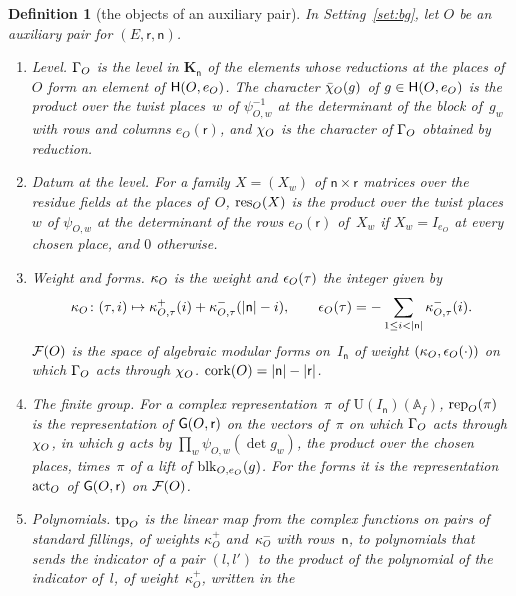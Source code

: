 \documentclass[11pt,a4paper]{article}
\newcommand{\m}[1]{\mbox{$#1$}}        %
\theoremstyle{plainx}
\theoremstyle{uprightx}
\newtheorem{definition}[theorem]{Definition}
\newcommand{\AAA}{\mathbb{A}}
\newcommand{\ix}[1]{\mathsf{#1}}
\newcommand{\UU}{\mathrm{U}}
\newcommand{\KK}[1]{\mathbf{K}_{#1}}
\begin{document}
\begin{definition}[the objects of an auxiliary pair]\label{d:auxobj}
In Setting~\ref{set:bg}, let $O$ be an auxiliary pair for \m{(E,\ix r,\ix n)}.
\begin{enumerate}[label=\textup{(\arabic*)},leftmargin=2.3em,itemsep=2pt]
\item \emph{Level.} \m{\levelGroup{O}} is the level in \m{\KK{\ix n}} of the elements whose reductions at the places
of~$O$ form an element of \m{\auxLevel{O}{e_O}}. The character \m{\auxLevelChar{O}{g}} of \m{g\in\auxLevel{O}{e_O}} is the
product over the twist places~$w$ of \m{\psi_{O,w}^{-1}} at the determinant of the block of~$g_w$ with rows and
columns \m{e_O(\ix r)}, and \m{\levelChar{O}} is the character of \m{\levelGroup{O}} obtained by reduction.
\item \emph{Datum at the level.} For a family \m{X=(X_w)} of \m{\ix n\times\ix r} matrices over the residue fields at
the places of~$O$, \m{\resDetDatum{O}{X}} is the product over the twist places~$w$ of \m{\psi_{O,w}} at the determinant
of the rows \m{e_O(\ix r)} of~$X_w$ if \m{X_w=I_{e_O}} at every chosen place, and $0$ otherwise.
\item \emph{Weight and forms.} \m{\auxKappa{O}} is the weight and \m{\detExp{O}{\tau}} the integer given by
\[\auxKappa{O}\colon(\tau,i)\mapsto\kappa^{+}_{O,\tau}(i)+\kappa^{-}_{O,\tau}(|\ix n|-i),\qquad
\detExp{O}{\tau}=-\sum_{1\le i<|\ix n|}\kappa^{-}_{O,\tau}(i).\] \m{\FormV{O}} is the space of algebraic modular
forms on~$I_{\ix n}$ of weight \m{(\auxKappa{O},\detExp{O}{\cdot})} on which \m{\levelGroup{O}} acts through
\m{\levelChar{O}}. \m{\rankDiff{O}=|\ix n|-|\ix r|}.
\item \emph{The finite group.} For a complex representation~$\pi$ of \m{\UU(I_{\ix n})(\AAA_f)},
\m{\chosenGLRep{O}{\pi}} is the representation of \m{\ChosenGL{O}{\ix r}} on the vectors of~$\pi$ on which
\m{\levelGroup{O}} acts through \m{\levelChar{O}}, in which $g$ acts by \m{\prod_w\psi_{O,w}(\det g_w)}, the product
over the chosen places, times~$\pi$ of a lift of \m{\firstBlockHom{O}{e_O}{g}}. For the forms it is the representation
\m{\formAction{O}} of \m{\ChosenGL{O}{\ix r}} on \m{\FormV{O}}.
\item \emph{Polynomials.} \m{\tensorPoly{O}} is the linear map from the complex functions on pairs of standard
fillings, of weights $\kappa^{+}_O$ and~$\kappa^{-}_O$ with rows~$\ix n$, to polynomials that sends the indicator of a
pair \m{(l,l')} to the product of the polynomial of the indicator of~$l$, of weight~$\kappa^{+}_O$, written in the

\end{enumerate}
\end{definition}
\end{document}
